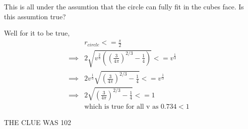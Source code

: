 \documentclass{article}
\begin{document}
This is all under the assumtion that the circle can fully fit
in the cubes face. Is this assumtion true?

Well for it to be true,
\begin{align*}
    &r_{circle} <= \frac{s}{2}\\
    \implies& 2\sqrt{
                    v^\frac{2}{3}\left(
                    \left(\frac{3}{4\pi}\right)^{2/3}
                    - \frac{1}{4}\right)
                } <= v^{\frac{1}{3}}\\
    \implies& 2v^\frac{1}{3}\sqrt{
                            \left(\frac{3}{4\pi}\right)^{2/3}
                            - \frac{1}{4}
                        } <= v^{\frac{1}{3}}\\
    \implies& 2\sqrt{
                \left(\frac{3}{4\pi}\right)^{2/3}
                - \frac{1}{4}
                } <= 1\\
            &\text{which is true for all v as } 0.734 < 1
\end{align*}

THE CLUE WAS 102
\end{document}
